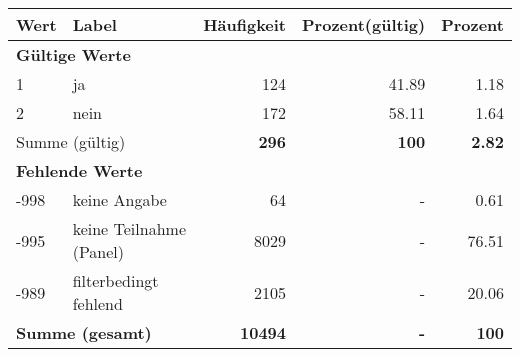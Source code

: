      \begin{longtable}{lXrrr}
     \toprule
     \textbf{Wert} & \textbf{Label} & \textbf{Häufigkeit} & \textbf{Prozent(gültig)} & \textbf{Prozent} \\
     \endhead
     \midrule
     \multicolumn{5}{l}{\textbf{Gültige Werte}}\\

     1 &
     \multicolumn{1}{X}{ ja   } &


       \num{124} &
       \num[round-mode=places,round-precision=2]{41.89} &
         \num[round-mode=places,round-precision=2]{1.18} \\

     2 &
     \multicolumn{1}{X}{ nein   } &


       \num{172} &
       \num[round-mode=places,round-precision=2]{58.11} &
         \num[round-mode=places,round-precision=2]{1.64} \\
     \midrule
     \multicolumn{2}{l}{Summe (gültig)} &
       \textbf{\num{296}} &
     \textbf{\num{100}} &
       \textbf{\num[round-mode=places,round-precision=2]{2.82}} \\
     \multicolumn{5}{l}{\textbf{Fehlende Werte}}\\
       -998 &
       keine Angabe &
         \num{64} &
        - &
         \num[round-mode=places,round-precision=2]{0.61} \\
       -995 &
       keine Teilnahme (Panel) &
         \num{8029} &
        - &
         \num[round-mode=places,round-precision=2]{76.51} \\
       -989 &
       filterbedingt fehlend &
         \num{2105} &
        - &
         \num[round-mode=places,round-precision=2]{20.06} \\
     \midrule
     \multicolumn{2}{l}{\textbf{Summe (gesamt)}} &
          \textbf{\num{10494}} &
        \textbf{-} &
        \textbf{\num{100}} \\
     \bottomrule
     \end{longtable}
     
